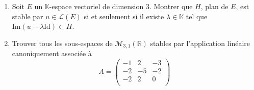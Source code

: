 \documentclass[a4paper,twoside,french,10pt]{VcCours}
\begin{document}
\begin{Exercice}{} \begin{enumerate}
\item Soit $E$ un $\mathbb{K}$-espace vectoriel de dimension $3$. Montrer que $H$, plan de $E$, est stable par $u \in \mathcal{L}(E)$ si et seulement si il existe $\lambda \in \mathbb{K}$ tel que $\textrm{Im}(u- \lambda \textrm{Id}) \subset H$.
\item Trouver tous les sous-espaces de $\mathcal{M}_{3,1}(\mathbb{R})$ stables par l'application linéaire canoniquement associée à 
$$A= \begin{pmatrix}
-1 & 2 & -3 \\
-2 & -5 & -2 \\
-2 & 2 & 0 \\
\end{pmatrix} $$
\end{enumerate}
\end{Exercice}
\end{document}
